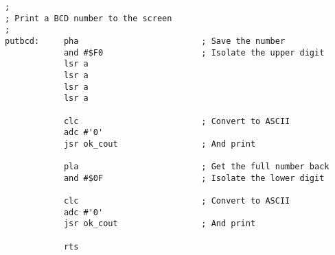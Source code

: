 \begin{verbatim}
;
; Print a BCD number to the screen
;
putbcd:     pha                         ; Save the number
            and #$F0                    ; Isolate the upper digit
            lsr a
            lsr a
            lsr a
            lsr a

            clc                         ; Convert to ASCII
            adc #'0'
            jsr ok_cout                 ; And print

            pla                         ; Get the full number back
            and #$0F                    ; Isolate the lower digit

            clc                         ; Convert to ASCII
            adc #'0'
            jsr ok_cout                 ; And print

            rts
\end{verbatim}
